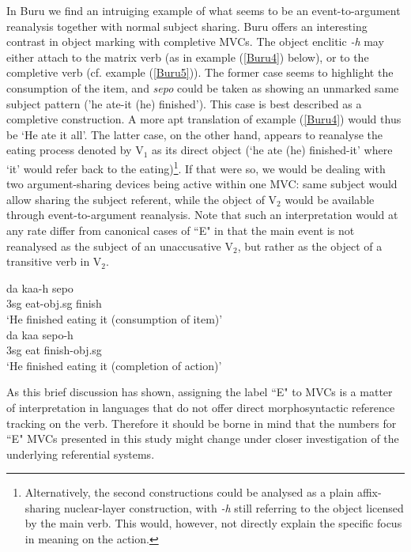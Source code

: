 In Buru we find an intruiging example of what seems to be an event-to-argument reanalysis together with normal subject sharing. Buru offers an interesting contrast in object marking with completive MVCs. The object enclitic \textit{-h} may either attach to the matrix verb (as in example (\ref{Buru4}) below), or to the completive verb (cf. example (\ref{Buru5})). The former case seems to highlight the consumption of the item, and \textit{sepo} could be taken as showing an unmarked same subject pattern ('he ate-it (he) finished'). This case is best described as a completive construction. A more apt translation of example (\ref{Buru4}) would thus be `He ate it all'. The latter case, on the other hand, appears to reanalyse the eating process denoted by V$_1$ as its direct object (`he ate (he) finished-it' where `it' would refer back to the eating)\footnote{Alternatively, the second constructions could be analysed as a plain affix-sharing nuclear-layer construction, with \textit{-h} still referring to the object licensed by the main verb. This would, however, not directly explain the specific focus in meaning on the action.}. If that were so, we would be dealing with two argument-sharing devices being active within one MVC: same subject would allow sharing the subject referent, while the object of V$_2$ would be available through event-to-argument reanalysis. Note that such an interpretation would at any rate differ from canonical cases of ``E" in that the main event is not reanalysed as the subject of an unaccusative V$_2$, but rather as the object of a transitive verb in V$_2$. 

\pex 
\a \label{Buru4}
\gll da kaa-h sepo \\
3\acs{sg} eat-\acs{obj}.\acs{sg} finish \\
\glft `He finished eating it (consumption of item)' \\ 
\z
\a \label{Buru5}
\gll da kaa sepo-h \\ 
3\acs{sg} eat finish-\acs{obj}.\acs{sg} \\
\glft `He finished eating it (completion of action)' \\ 
\z
\xe

As this brief discussion has shown, assigning the label ``E" to MVCs is a matter of interpretation in languages that do not offer direct morphosyntactic reference tracking on the verb. Therefore it should be borne in mind that the numbers for ``E" MVCs presented in this study might change under closer investigation of the underlying referential systems.

